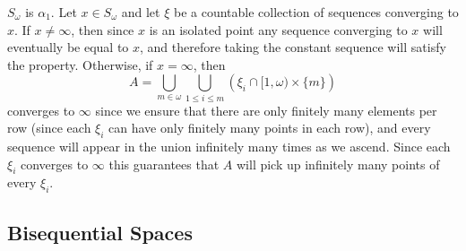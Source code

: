 \documentclass{article}
\begin{document}
\begin{exam}
    \(S_{\omega}\) is \(\alpha_1\). Let \(x \in S_{\omega}\) and let \(\xi\) be a countable collection of sequences converging to \(x\). If \(x \neq \infty\), then since \(x\) is an isolated point any sequence converging to \(x\) will eventually be equal to \(x\), and therefore taking the constant sequence will satisfy the property. Otherwise, if \(x = \infty\), then 
    \[
    A = \bigcup_{m \in \omega}\bigcup_{1\leq i \leq m} \left(\xi_i \cap [1, \omega)\times \{m\}\right)
    \] 
    converges to \(\infty\) since we ensure that there are only finitely many elements per row (since each \(\xi_i\) can have only finitely many points in each row), and every sequence will appear in the union infinitely many times as we ascend. Since each \(\xi_i\) converges to \(\infty\) this guarantees that \(A\) will pick up infinitely many points of every  \(\xi_i\). 
\end{exam}



\subsection{Bisequential Spaces}

\begin{defn}
    
\end{defn}





%
%
%
%
%




%
\end{document}
